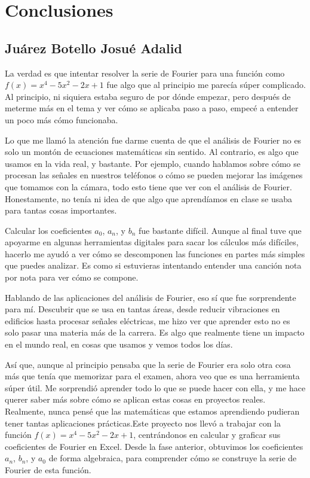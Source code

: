 \section{Conclusiones}
\subsection{Juárez Botello Josué Adalid}

La verdad es que intentar resolver la serie de Fourier para una función como \(f(x)=x^4-5x^2-2x+1\) fue algo que al principio me parecía súper complicado. Al principio, ni siquiera estaba seguro de por dónde empezar, pero después de meterme más en el tema y ver cómo se aplicaba paso a paso, empecé a entender un poco más cómo funcionaba.

Lo que me llamó la atención fue darme cuenta de que el análisis de Fourier no es solo un montón de ecuaciones matemáticas sin sentido. Al contrario, es algo que usamos en la vida real, y bastante. Por ejemplo, cuando hablamos sobre cómo se procesan las señales en nuestros teléfonos o cómo se pueden mejorar las imágenes que tomamos con la cámara, todo esto tiene que ver con el análisis de Fourier. Honestamente, no tenía ni idea de que algo que aprendíamos en clase se usaba para tantas cosas importantes.

Calcular los coeficientes \(a_0\), \(a_n\), y \(b_n\) fue bastante difícil. Aunque al final tuve que apoyarme en algunas herramientas digitales para sacar los cálculos más difíciles, hacerlo me ayudó a ver cómo se descomponen las funciones en partes más simples que puedes analizar. Es como si estuvieras intentando entender una canción nota por nota para ver cómo se compone.

Hablando de las aplicaciones del análisis de Fourier, eso sí que fue sorprendente para mí. Descubrir que se usa en tantas áreas, desde reducir vibraciones en edificios hasta procesar señales eléctricas, me hizo ver que aprender esto no es solo pasar una materia más de la carrera. Es algo que realmente tiene un impacto en el mundo real, en cosas que usamos y vemos todos los días.

Así que, aunque al principio pensaba que la serie de Fourier era solo otra cosa más que tenía que memorizar para el examen, ahora veo que es una herramienta súper útil. Me sorprendió aprender todo lo que se puede hacer con ella, y me hace querer saber más sobre cómo se aplican estas cosas en proyectos reales. Realmente, nunca pensé que las matemáticas que estamos aprendiendo pudieran tener tantas aplicaciones prácticas.Este proyecto nos llevó a trabajar con la función \(f(x)=x^4-5x^2-2x+1\), centrándonos en calcular y graficar sus coeficientes de Fourier en Excel. Desde la fase anterior, obtuvimos los coeficientes \(a_n\), \(b_n\), y \(a_0\) de forma algebraica, para comprender cómo se construye la serie de Fourier de esta función.

